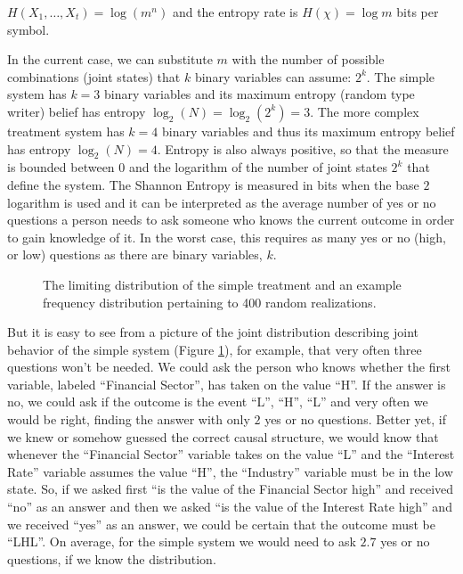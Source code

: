 $H(X_1, \ldots, X_t)=\log(m^n)$ and the entropy rate is $H(\chi)=\log m$ bits per symbol. 

In the current case, we can substitute $m$ with the number of possible combinations (joint states) that $k$ binary variables can assume: $2^k$.
The simple system has $k=3$ binary variables and its maximum entropy (random type writer) belief has entropy $\log_2(N)=\log_2(2^k) = 3$. The more complex treatment system has $k=4$ binary variables and thus its maximum entropy belief has entropy $\log_2(N) = 4$. Entropy is also always positive, so that the measure is bounded between $0$ and the logarithm of the number of joint states $2^k$ that define the system. The Shannon Entropy is measured in bits when the base $2$ logarithm is used and it can be interpreted as the average number of yes or no questions a person needs to ask someone who knows the current outcome in order to gain knowledge of it.  In the worst case, this requires as many yes or no (high, or low) questions as there are binary variables, $k$. 

\begin{figure}
\noindent{}
\caption{The limiting distribution of the simple treatment and an example frequency distribution pertaining to 400 random realizations.}
\label{fig:simplejoint} 
\end{figure}

But it is easy to see from a picture of the joint distribution describing joint behavior of the simple system (Figure \ref{fig:simplejoint}), for example, that very often three questions won't be needed. We could ask the person who knows whether the first variable, labeled ``Financial Sector'', has taken on the value ``H''.  If the answer is no, we could ask if the outcome is the event ``L'', ``H'', ``L'' and very often we would be right, finding the answer with only $2$ yes or no questions. Better yet, if we knew or somehow guessed the correct causal structure, we would know that whenever the ``Financial Sector'' variable takes on the value ``L'' and the ``Interest Rate'' variable assumes the value ``H'', the ``Industry'' variable must be in the low state. So, if we asked first ``is the value of the Financial Sector high'' and received ``no'' as an answer and then we asked ``is the value of the Interest Rate high'' and we received ``yes'' as an answer, we could be certain that the outcome must be ``LHL''. On average, for the simple system we would need to ask $2.7$ yes or no questions, if we know the distribution.   

